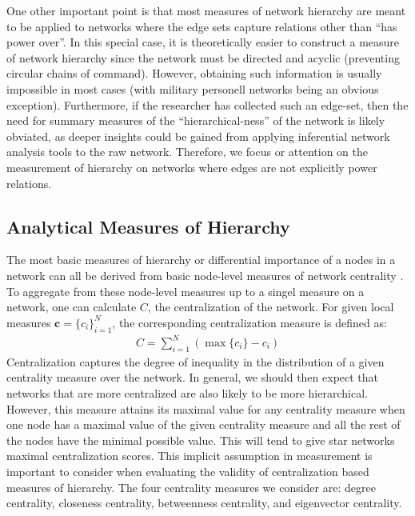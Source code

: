 \documentclass[3p,times]{elsarticle}
\begin{document}
One other important point is that most measures of network hierarchy are meant to be applied to networks where the edge sets capture relations other than ``has power over''. In this special case, it is theoretically easier to construct a measure of network hierarchy since the network must be directed and acyclic (preventing circular chains of command). However, obtaining such information is usually impossible in most cases (with military personell networks being an obvious exception). Furthermore, if the researcher has collected such an edge-set, then the need for summary measures of the ``hierarchical-ness'' of the network is likely obviated, as deeper insights could be gained from applying inferential network analysis tools to the raw network. Therefore, we focus or attention on the measurement of hierarchy on networks where edges are not explicitly power relations.

\subsection{Analytical Measures of Hierarchy}
The most basic measures of hierarchy or differential importance of a nodes in a network can all be derived from basic node-level measures of network centrality \cite{Wasserman1994}. To aggregate from these node-level measures up to a singel measure on a network, one can calculate $C$, the centralization of the network. For given local measures $\mathbf{c} = \{c_i\}_{i=1}^N$, the corresponding centralization measure is defined as: 
\begin{align}
	C = \sum_{i=1}^{N}{(\max\{c_{i}\}-c_{i})}
\end{align}
Centralization captures the degree of inequality in the distribution of a given centrality measure over the network. In general, we should then expect that networks that are more centralized are also likely to be more hierarchical. However, this measure attains its maximal value for any centrality measure when one node has a maximal value of the given centrality measure and all the rest of the nodes have the minimal possible value. This will tend to give star networks maximal centralization scores. This implicit assumption in measurement is important to consider when evaluating the validity of centralization based measures of hierarchy. The four centrality measures we consider are: degree centrality, closeness centrality, betweenness centrality, and eigenvector centrality. 
\end{document}
